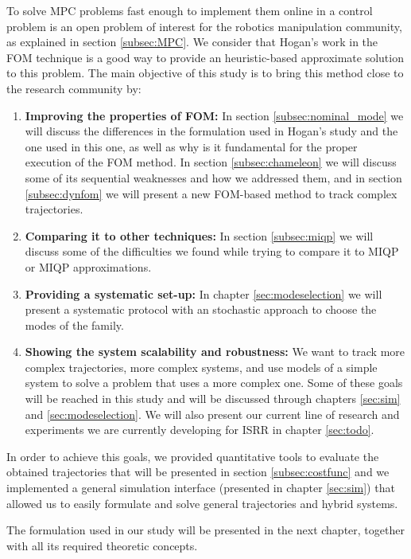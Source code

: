 \documentclass[12,twoside]{TFG-GM}
\theoremstyle{definition}
\theoremstyle{remark}
\begin{document}
To solve MPC problems fast enough to implement them online in a control problem is an open problem of interest for the robotics manipulation community, as explained in section \ref{subsec:MPC}. We consider that Hogan's work in the FOM technique is a good way to provide an heuristic-based approximate solution to this problem. The main objective of this study is to bring this method close to the research community by:
\begin{enumerate}
\item {\textbf{Improving the properties of FOM:}} In section \ref{subsec:nominal_mode} we will discuss the differences in the formulation used in Hogan's study and the one used in this one, as well as why is it fundamental for the proper execution of the FOM method. In section \ref{subsec:chameleon} we will discuss some of its sequential weaknesses and how we addressed them, and in section \ref{subsec:dynfom} we will present a new FOM-based method to track complex trajectories.

\item{\textbf{Comparing it to other techniques:}} In section \ref{subsec:miqp} we will discuss some of the difficulties we found while trying to compare it to MIQP or MIQP approximations.

\item{\textbf{Providing a systematic set-up:}} In chapter \ref{sec:modeselection} we will present a systematic protocol with an stochastic approach to choose the modes of the family.

\item{\textbf{Showing the system scalability and robustness:}} We want to track more complex trajectories, more complex systems, and use models of a simple system to solve a problem that uses a more complex one. Some of these goals will be reached in this study and will be discussed through chapters \ref{sec:sim} and \ref{sec:modeselection}. We will also present our current line of research and experiments we are currently developing for ISRR in chapter \ref{sec:todo}.
\end{enumerate} 

In order to achieve this goals, we provided quantitative tools to evaluate the obtained trajectories that will be presented in section \ref{subsec:costfunc} and we implemented a general simulation interface (presented in chapter \ref{sec:sim}) that allowed us to easily formulate and solve general trajectories and hybrid systems.

The formulation used in our study will be presented in the next chapter, together with all its required theoretic concepts.
\end{document}
